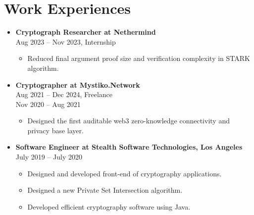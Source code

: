 \documentclass[a4paper,12pt]{article}
\begin{document}
\section*{Work Experiences}
\begin{itemize}[left=0pt, label={}, parsep=0pt]
    \item \textbf{Cryptograph Researcher at Nethermind} \\
    Aug 2023 – Nov 2023, Internship
    \begin{itemize}[left=0pt,label=\textbullet,topsep=0pt]
        \item Reduced final argument proof size and verification complexity in STARK algorithm.
    \end{itemize}
    \item \textbf{Cryptographer at Mystiko.Network} \\
    Aug 2021 – Dec 2024, Freelance\\
    Nov 2020 – Aug 2021
    \begin{itemize}[left=0pt,label=\textbullet,topsep=0pt]
        \item Designed the first auditable web3 zero-knowledge connectivity and privacy base layer.
    \end{itemize}
    \item \textbf{Software Engineer at Stealth Software Technologies, Los Angeles} \\
    July 2019 – July 2020 
    \begin{itemize}[left=0pt,label=\textbullet,topsep=0pt]
        \item Designed and developed front-end of cryptography applications. 
        \item Designed a new Private Set Intersection algorithm. 
        \item Developed efficient cryptography software using Java.
    \end{itemize}
\end{itemize}
\end{document}
